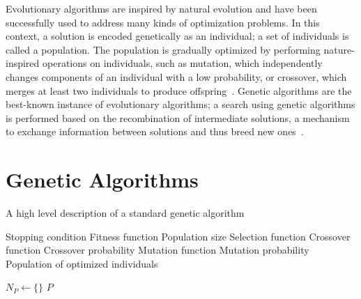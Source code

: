 \documentclass[paper=a4,%
  twoside,%
  BCOR4mm,%
  abstract=true,%
  toc=bibliography,%
  chapterprefix=true,%
  toc=bibliographynumbered,%
  open=right,%
  english,%
  pagesize=pdftex]{scrreprt}
\newcommand{\Desc}[2]{\State \makebox[2em][l]{#1}#2}
\begin{document}
Evolutionary algorithms are inspired by natural evolution and have been successfully used to address many kinds of optimization problems. In this context, a solution is encoded genetically as an individual; a set of individuals is called a population. The population is gradually optimized by performing nature-inspired operations on individuals, such as mutation, which independently changes components of an individual with a low probability, or crossover, which merges at least two individuals to produce offspring~\cite{Campos2017a}. Genetic algorithms are the best-known instance of evolutionary algorithms; a search using genetic algorithms is performed based on the recombination of intermediate solutions, a mechanism to exchange information between solutions and thus breed new ones~\cite{McMinn_2004}.

\section{Genetic Algorithms}
\begin{algorithm}
\caption{A high level description of a standard genetic algorithm~\cite{Campos2017}}\label{alg:genetic-algorithm}
\begin{algorithmic}
\Input
  \Desc{$C$}{Stopping condition}
  \Desc{$\delta$}{Fitness function}
  \Desc{$p_s$}{Population size}
  \Desc{$s_f$}{Selection function}
  \Desc{$c_f$}{Crossover function}
  \Desc{$c_p$}{Crossover probability}
  \Desc{$m_f$}{Mutation function}
  \Desc{$m_p$}{Mutation probability}
  \EndInput
  \Output
  \Desc{$P$}{Population of optimized individuals}
  \EndOutput
{}

    \State $N_P \gets \{\}$
    \EndWhile
\EndWhile
\State \Return $P$
\end{algorithmic}
\end{algorithm}
\end{document}
